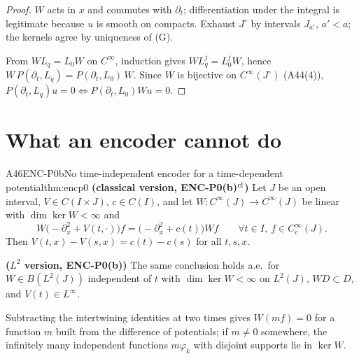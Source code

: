 \begin{proof}
$W$ acts in $x$ and commutes with $\partial_t$; differentiation under the integral is legitimate because $u$ is smooth on compacts. Exhaust $J^\circ$ by intervals $J_{a'}$, $a'<a$; the kernels agree by uniqueness of (G).

From $WL_q=L_0W$ on $C^\infty$, induction gives $WL_q^j=L_0^jW$, hence $W\,P(\partial_t,L_q)=P(\partial_t,L_0)\,W$. Since $W$ is bijective on $C^\infty(J^\circ)$ (A44(4)), $P(\partial_t,L_q)u=0\iff P(\partial_t,L_0)Wu=0$.

\end{proof}

\section{What an encoder cannot do}

\begin{dimcard}{A46}{ENC-P0b}{No time-independent encoder for a time-dependent potential}{\pw}{thm:encp0}
\textbf{(classical version, ENC-P0(b)$^{\rm cl}$)} Let $J$ be an open interval, $V\in C(I\times J)$, $c\in C(I)$, and let $W:C^\infty(J)\to C^\infty(J)$ be linear with $\dim\ker W<\infty$ and
\[
W\big(-\partial_x^2+V(t,\cdot)\big)f=\big(-\partial_x^2+c(t)\big)Wf\qquad\forall t\in I,\ f\in C_c^\infty(J).
\]
Then $V(t,x)-V(s,x)=c(t)-c(s)$ for all $t,s,x$.

\textbf{($L^2$ version, ENC-P0(b))} The same conclusion holds a.e.\ for $W\in B(L^2(J))$ independent of $t$ with $\dim\ker W<\infty$ on $L^2(J)$, $WD\subset D$, and $V(t)\in L^\infty$.
\end{dimcard}

\begin{proofidea}
Subtracting the intertwining identities at two times gives $W(mf)=0$ for a function $m$ built from the difference of potentials; if $m\ne0$ somewhere, the infinitely many independent functions $m\varphi_k$ with disjoint supports lie in $\ker W$.
\end{proofidea}

